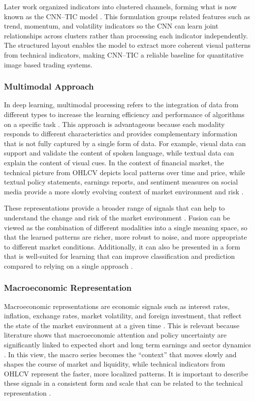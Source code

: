 \documentclass[12pt,a4paper]{article}
\begin{document}
	Later work organized indicators into clustered channels, forming what is now known as the CNN--TIC model \cite{maratkhan2021deep}. This formulation groups related features such as trend, momentum, and volatility indicators so the CNN can learn joint relationships across clusters rather than processing each indicator independently. The structured layout enables the model to extract more coherent visual patterns from technical indicators, making CNN--TIC a reliable baseline for quantitative image based trading systems.
	

	\subsubsection*{Multimodal Approach}
	In deep learning, multimodal processing refers to the integration of data from different types to increase the learning efficiency and performance of algorithms on a specific task \cite{dimitri2022short}. This approach is advantageous because each modality responds to different characteristics and provides complementary information that is not fully captured by a single form of data. For example, visual data can support and validate the content of spoken language, while textual data can explain the content of visual cues. In the context of financial market, the technical picture from OHLCV depicts local patterns over time and price, while textual policy statements, earnings reports, and sentiment measures on social media provide a more slowly evolving context of market environment and risk \cite{farimani2024adaptive,karadacs2025multimodal}.

	These representations provide a broader range of signals that can help to understand the change and risk of the market environment \cite{zhang2020multimodal}. Fusion can be viewed as the combination of different modalities into a single meaning space, so that the learned patterns are richer, more robust to noise, and more appropriate to different market conditions. Additionally, it can also be presented in a form that is well-suited for learning that can improve classification and prediction compared to relying on a single approach \cite{gallo2018image}. 

	\subsubsection*{Macroeconomic Representation}
	Macroeconomic representations are economic signals such as interest rates, inflation, exchange rates, market volatility, and foreign investment, that reflect the state of the market environment at a given time \cite{artantacs2020selected}. This is relevant because literature shows that macroeconomic attention and policy uncertainty are significantly linked to expected short and long term earnings and sector dynamics \cite{ma2022macroeconomic}. In this view, the macro series becomes the “context” that moves slowly and shapes the course of market and liquidity, while technical indicators from OHLCV represent the faster, more localized patterns. It is important to describe these signals in a consistent form and scale that can be related to the technical representation \cite{wang2019aggregating}.
\end{document}
